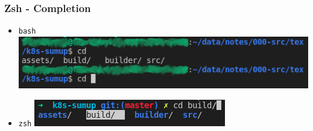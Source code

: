\subsubsection{Zsh - Completion}
\begin{frame}[fragile]{\subsubsecname}
  \begin{itemize}
    \item \texttt{bash}
    \includegraphics[width=1\linewidth]{assets/shell-bash-completion.png}
    \item \texttt{zsh}
    \includegraphics[width=1\linewidth]{assets/shell-zsh-completion.png}
  \end{itemize}
\end{frame}
